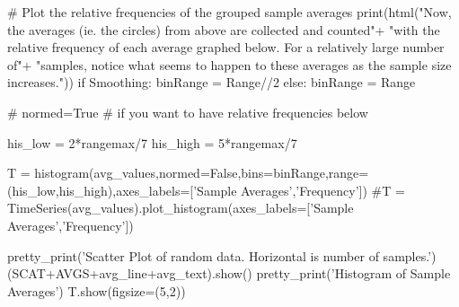 \documentclass[10pt,]{book}
\numberwithin{equation}{section}
\begin{document}
\begin{sageinput}
    
#  Plot the relative frequencies of the grouped sample averages
    print(html("Now, the averages (ie. the circles) from above are collected and counted\n"+
         "with the relative frequency of each average graphed below.  For a relatively large number of\n"+
         "samples, notice what seems to happen to these averages as the sample size increases."))
    if Smoothing:
        binRange = Range//2
    else:
        binRange = Range
    
    # normed=True  # if you want to have relative frequencies below
    
    his_low = 2*rangemax/7
    his_high = 5*rangemax/7
    
    T = histogram(avg_values,normed=False,bins=binRange,range=(his_low,his_high),axes_labels=['Sample Averages','Frequency']) 
    #T = TimeSeries(avg_values).plot_histogram(axes_labels=['Sample Averages','Frequency'])   
    
    pretty_print('Scatter Plot of random data.  Horizontal is number of samples.')
    (SCAT+AVGS+avg_line+avg_text).show()
    pretty_print('Histogram of Sample Averages')
    T.show(figsize=(5,2))
\end{sageinput}
\end{document}
